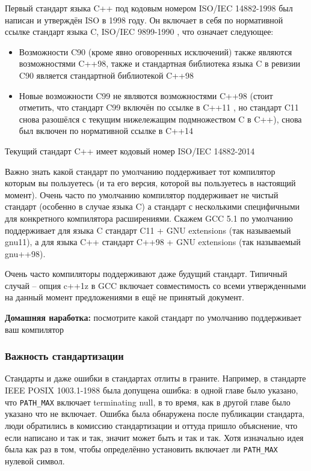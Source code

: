\documentclass[a4paper,12pt,oneside]{article}
\begin{document}
Первый стандарт языка C++ под кодовым номером ISO/IEC 14882-1998 \cite{stdcpp98} был написан и утверждён ISO в 1998 году. Он включает в себя по нормативной ссылке стандарт языка C, ISO/IEC 9899-1990 \cite{stdc90}, что означает следующее: 

\begin{itemize}
\item
Возможности C90 (кроме явно оговоренных исключений) также являются возможностями C++98, также и стандартная библиотека языка C в ревизии C90 является стандартной библиотекой C++98
\item
Новые возможности C99 \cite{stdc90} не являются возможностями C++98 (стоит отметить, что стандарт C99 включён по ссылке в C++11 \cite{stdcpp11}, но стандарт C11 \cite{stdc11} снова разошёлся с текущим нижележащим подмножеством C в C++), снова был включен по нормативной ссылке в C++14 \cite{stdcpp14}
\end{itemize}

Текущий стандарт C++ имеет кодовый номер ISO/IEC 14882-2014

Важно знать какой стандарт по умолчанию поддерживает тот компилятор которым вы пользуетесь (и та его версия, которой вы пользуетесь в настоящий момент). Очень часто по умолчанию компилятор поддерживает не чистый стандарт (особенно в случае языка C) а стандарт с несколькими специфичными для конкретного компилятора расширениями. Скажем GCC 5.1 по умолчанию поддерживает для языка C стандарт C11 + GNU extensions (так называемый gnu11), а для языка C++ стандарт C++98 + GNU extensions (так называемый gnu++98).

Очень часто компиляторы поддерживают даже будущий стандарт. Типичный случай -- опция c++1z в GCC включает совместимость со всеми утвержденными на данный момент предложениями в ещё не принятый документ.

\textbf{Домашняя наработка:} посмотрите какой стандарт по умолчанию поддерживает ваш компилятор

\subsubsection{Важность стандартизации}\label{StandartizationImportance}

Стандарты и даже ошибки в стандартах отлиты в граните. Например, в стандарте IEEE POSIX 1003.1-1988 была допущена ошибка: в одной главе было указано, что \lstinline!PATH_MAX! включает terminating null, в то время, как в другой главе было указано что не включает. Ошибка была обнаружена после публикации стандарта, люди обратились в комиссию стандартизации и оттуда пришло объяснение, что если написано и так и так, значит может быть и так и так. Хотя изначально идея была как раз в том, чтобы определённо установить включает ли \lstinline!PATH_MAX! нулевой символ.
\end{document}
